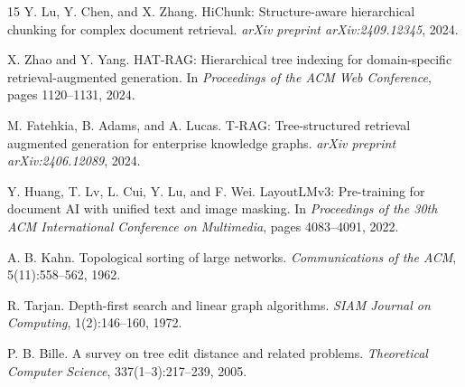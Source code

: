 \documentclass[12pt,a4paper]{report}
\begin{document}
\begin{thebibliography}{15}
Y. Lu, Y. Chen, and X. Zhang.
HiChunk: Structure-aware hierarchical chunking for complex document retrieval.
\textit{arXiv preprint arXiv:2409.12345}, 2024.

X. Zhao and Y. Yang.
HAT-RAG: Hierarchical tree indexing for domain-specific retrieval-augmented generation.
In \textit{Proceedings of the ACM Web Conference}, pages 1120--1131, 2024.

M. Fatehkia, B. Adams, and A. Lucas.
T-RAG: Tree-structured retrieval augmented generation for enterprise knowledge graphs.
\textit{arXiv preprint arXiv:2406.12089}, 2024.

Y. Huang, T. Lv, L. Cui, Y. Lu, and F. Wei.
LayoutLMv3: Pre-training for document AI with unified text and image masking.
In \textit{Proceedings of the 30th ACM International Conference on Multimedia}, pages 4083--4091, 2022.

A. B. Kahn.
Topological sorting of large networks.
\textit{Communications of the ACM}, 5(11):558--562, 1962.

R. Tarjan.
Depth-first search and linear graph algorithms.
\textit{SIAM Journal on Computing}, 1(2):146--160, 1972.

P. B. Bille.
A survey on tree edit distance and related problems.
\textit{Theoretical Computer Science}, 337(1--3):217--239, 2005.

\end{thebibliography}
\end{document}
